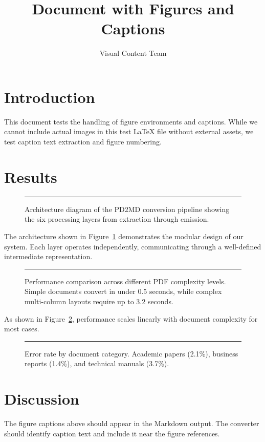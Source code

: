 \documentclass[12pt]{article}
\title{Document with Figures and Captions}
\author{Visual Content Team}
\begin{document}
\maketitle

\section{Introduction}
This document tests the handling of figure environments and captions. While we
cannot include actual images in this test LaTeX file without external assets,
we test caption text extraction and figure numbering.

\section{Results}

\begin{figure}[H]
\centering
\rule{8cm}{5cm} %
\caption{Architecture diagram of the PD2MD conversion pipeline showing the six
processing layers from extraction through emission.}
\label{fig:architecture}
\end{figure}

The architecture shown in Figure~\ref{fig:architecture} demonstrates the modular
design of our system. Each layer operates independently, communicating through
a well-defined intermediate representation.

\begin{figure}[H]
\centering
\rule{8cm}{4cm}
\caption{Performance comparison across different PDF complexity levels. Simple
documents convert in under 0.5 seconds, while complex multi-column layouts
require up to 3.2 seconds.}
\label{fig:performance}
\end{figure}

As shown in Figure~\ref{fig:performance}, performance scales linearly with
document complexity for most cases.

\begin{figure}[H]
\centering
\rule{6cm}{4cm}
\caption{Error rate by document category. Academic papers (2.1\%), business
reports (1.4\%), and technical manuals (3.7\%).}
\label{fig:errors}
\end{figure}

\section{Discussion}
The figure captions above should appear in the Markdown output. The converter
should identify caption text and include it near the figure references.
\end{document}
